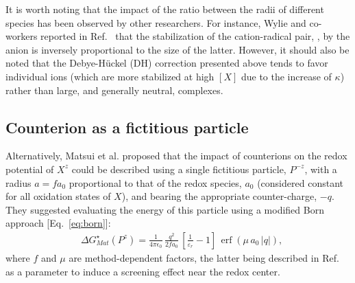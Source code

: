 \documentclass[review,preprint]{elsarticle}
\DeclareMathOperator{\erf}{erf}
\begin{document}
It is worth noting that the impact of the ratio between the radii of different species has been observed by other researchers. For instance, Wylie and co-workers reported in Ref.~ that the stabilization of the cation-radical pair, , by the anion is inversely proportional to the size of the latter. However, it should also be noted that the Debye-Hückel (DH) correction presented above tends to favor individual ions (which are more stabilized at high $[X]$ due to the increase of $\kappa$) rather than large, and generally neutral, complexes.


\subsection{Counterion as a fictitious particle}

Alternatively, Matsui et al. \cite{matsuiDensityFunctionalTheory2013} proposed that the impact of counterions on the redox potential of $X^z$ could be described using a single fictitious particle, $P^{-z}$, with a radius $a=fa_0$ proportional to that of the redox species, $a_0$ (considered constant for all oxidation states of $X$), and bearing the appropriate counter-charge, $-q$. They suggested evaluating the energy of this particle using a modified Born approach [Eq.~\eqref{eq:born}]:\begin{align}
	&\Delta G^\star_{Mat}(P^z) = \frac{1}{4\pi\epsilon_0}\, \frac{q^2}{2fa_0}\,\left[\frac{1}{\varepsilon_r}-1\right]\,\erf(\mu\,a_0\,|q|),
\end{align}
where $f$ and $\mu$ are method-dependent factors, the latter being described in Ref.~ as a parameter to induce a screening effect near the redox center.
\end{document}

